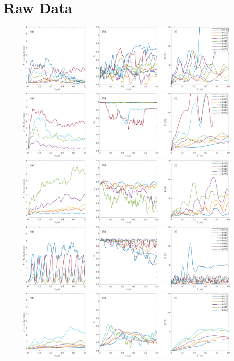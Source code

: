 \section{Raw Data}
\begin{figure}[t]
\begin{center}
\includegraphics[width=\textwidth]{SMFigures/ULShRaw.pdf}
\includegraphics[width=\textwidth]{SMFigures/VeShRaw.pdf}
\includegraphics[width=\textwidth]{SMFigures/MLShRaw.pdf}
\includegraphics[width=\textwidth]{SMFigures/StShRaw.pdf}
\includegraphics[width=\textwidth]{SMFigures/ULTGRaw.pdf}

\end{center}
\end{figure}
